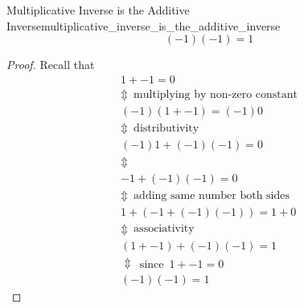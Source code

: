 \begin{proposition}{Multiplicative Inverse is the Additive
Inverse}{multiplicative_inverse_is_the_additive_inverse}
\[
\left( - 1 \right) \left( - 1 \right) =  1
\]
\end{proposition}
\begin{proof}
    Recall that 
    \begin{gather*}
        1 +  -1 = 0 \\
        \Updownarrow \enspace \text{multiplying by non-zero constant} \\
        \left( -1 \right) \left( 1 + - 1 \right) = \left( - 1 \right) 0 \\
        \Updownarrow  \enspace \text{distributivity}  \\
        \left( - 1 \right) 1 +  \left( - 1 \right) \left( - 1 \right) = 0 \\
        \Updownarrow   \\
        -  1 +  \left( - 1 \right) \left( - 1 \right) = 0 \\
        \Updownarrow \enspace \text{adding same number both sides}    \\
        1 +  \left( - 1 +  \left( - 1 \right) \left( - 1 \right)  \right) = 1 +
        0 \\
        \Updownarrow \enspace \text{associativity} \\
        \left( 1 +  - 1 \right) +  \left( - 1 \right) \left( - 1 \right) =  1 \\
        \Updownarrow \enspace \text{since} \enspace  1 +  - 1 = 0\\
        \left( - 1 \right) \left( - 1 \right) = 1
    \end{gather*}
\end{proof}
